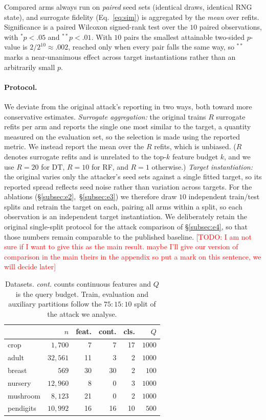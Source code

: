 \documentclass[sigconf,anonymous,review]{acmart}
\newcommand{\TODO}[1]{\textcolor{red}{[TODO: #1]}}
\begin{document}
Compared arms always run on \emph{paired} seed sets (identical draws, identical RNG state), and
surrogate fidelity (Eq.~\ref{eq:sim}) is aggregated by the \emph{mean} over refits. Significance is a
paired Wilcoxon signed-rank test over the $10$ paired observations, with $^{*}p{<}.05$ and
$^{**}p{<}.01$. With $10$ pairs the smallest attainable two-sided $p$-value is $2/2^{10}\approx.002$,
reached only when every pair falls the same way, so $^{**}$ marks a near-unanimous effect across
target instantiations rather than an arbitrarily small $p$.

\paragraph{Protocol.} We deviate from the original attack's reporting in two ways, both toward more
conservative estimates. \emph{Surrogate aggregation:} the original trains $R$ surrogate refits per
arm and reports the single one most similar to the target, a quantity measured on the evaluation set,
so the selection is made using the reported metric. We instead report the mean over the $R$ refits,
which is unbiased. ($R$ denotes surrogate refits and is unrelated to the top-$k$ feature budget $k$, and we use $R{=}20$ for DT, $R{=}10$ for RF, and $R{=}1$ otherwise.)
\emph{Target instantiation:} the original varies only the attacker's seed sets against a single fitted
target, so its reported spread reflects seed noise rather than variation across targets. For the
ablations (\S\ref{subsec:e2},~\S\ref{subsec:e3}) we therefore draw $10$ independent train/test splits
and retrain the target on each, pairing all arms within a split, so each observation is an independent
target instantiation. 
We deliberately retain the original single-split protocol for the attack
comparison of \S\ref{subsec:e4}, so that those numbers remain comparable to the published baseline. \TODO{I am not sure if I want to give this as the main result. maybe I'll give our version of comparison in the main theirs in the appendix so put a mark on this sentence, we will decide later}

\begin{table}[t]
\centering
\caption{Datasets. \emph{cont.} counts continuous features and $Q$ is the query budget. Train, evaluation
and auxiliary partitions follow the $75\!:\!15\!:\!10$ split of the attack we analyse.}
\label{tab:datasets}
\begin{tabular}{lrrrrr}
\toprule
 & $n$ & feat. & cont. & cls. & $Q$ \\
\midrule
crop      & $1{,}700$  & 7  & 7  & 17 & $1000$ \\
adult     & $32{,}561$ & 11 & 3  & 2  & $1000$ \\
breast    & $569$      & 30 & 30 & 2  & $100$  \\
nursery   & $12{,}960$ & 8  & 0  & 3  & $1000$ \\
mushroom  & $8{,}123$  & 21 & 0  & 2  & $1000$ \\
pendigits & $10{,}992$ & 16 & 16 & 10 & $500$  \\
\bottomrule
\end{tabular}
\end{table}
\end{document}
